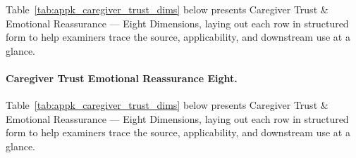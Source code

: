 {\tablestripes\tablefontsize

\noindent Table~\ref{tab:appk_caregiver_trust_dims} below presents Caregiver Trust \& Emotional Reassurance --- Eight Dimensions, laying out each row in structured form to help examiners trace the source, applicability, and downstream use at a glance. %
\paragraph{Caregiver Trust Emotional Reassurance Eight.} %
\noindent Table~\ref{tab:appk_caregiver_trust_dims} below presents Caregiver Trust \& Emotional Reassurance --- Eight Dimensions, laying out each row in structured form to help examiners trace the source, applicability, and downstream use at a glance. %



}
